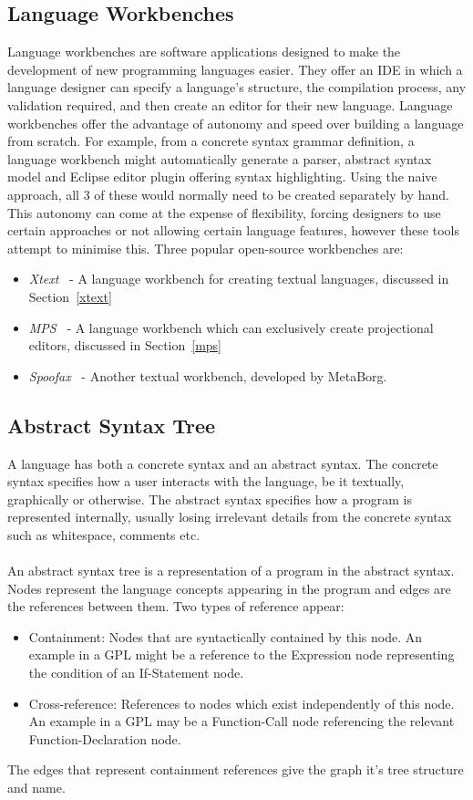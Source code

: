 \documentclass{article}
\begin{document}
\subsection{Language Workbenches}
Language workbenches are software applications designed to make the development of new programming languages easier. They offer an IDE in which a language designer can specify a language's structure, the compilation process, any validation required, and then create an editor for their new language. Language workbenches offer the advantage of autonomy and speed over building a language from scratch. For example, from a concrete syntax grammar definition, a language workbench might automatically generate a parser, abstract syntax model and Eclipse editor plugin offering syntax highlighting. Using the naive approach, all 3 of these would normally need to be created separately by hand. This autonomy can come at the expense of flexibility, forcing designers to use certain approaches or not allowing certain language features, however these tools attempt to minimise this. Three popular open-source workbenches are:
\begin{itemize}
\item \emph{Xtext}~\cite{xtext} - A language workbench for creating textual languages, discussed in Section~\ref{xtext}
\item \emph{MPS}~\cite{mps} - A language workbench which can exclusively create projectional editors, discussed in Section~\ref{mps}
\item \emph{Spoofax}~\cite{spoofax} - Another textual workbench, developed by MetaBorg. 
\end{itemize}
%
\subsection{Abstract Syntax Tree}
A language has both a concrete syntax and an abstract syntax. The concrete syntax specifies how a user interacts with the language, be it textually, graphically or otherwise. The abstract syntax specifies how a program is represented internally, usually losing irrelevant details from the concrete syntax such as whitespace, comments etc.
\\
\\
An abstract syntax tree is a representation of a program in the abstract syntax. Nodes represent the language concepts appearing in the program and edges are the references between them. Two types of reference appear:
\begin{itemize}
\item Containment: Nodes that are syntactically contained by this node. An example in a GPL might be a reference to the Expression node representing the condition of an If-Statement node.
\item Cross-reference: References to nodes which exist independently of this node. An example in a GPL may be a Function-Call node referencing the relevant Function-Declaration node. 
\end{itemize}
The edges that represent containment references give the graph it's tree structure and name.
\end{document}
